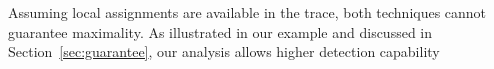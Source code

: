 Assuming local assignments are available in the trace, both techniques 
cannot guarantee maximality. As illustrated in our example and discussed 
in Section~\ref{sec:guarantee}, our analysis allows higher detection capability
 


